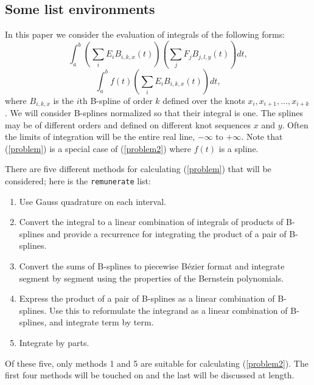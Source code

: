 \subsection{Some list environments}
In this paper we consider the evaluation of integrals of the 
following forms:
\begin{equation}
\int_a^b \left( \sum_i E_i B_{i,k,x}(t) \right)
         \left( \sum_j F_j B_{j,l,y}(t) \right) dt,\label{problem}
\end{equation}
\begin{equation}
\int_a^b f(t) \left( \sum_i E_i B_{i,k,x}(t) \right) dt,\label{problem2}
\end{equation}
where $B_{i,k,x}$ is the $i$th B-spline of order $k$ defined over the
knots $x_i, x_{i+1}, \ldots, x_{i+k}$.
We will consider B-splines normalized so that their integral is one.
The splines may be of different orders and
defined on different knot sequences $x$ and $y$.
Often the limits of integration will be the entire real line, $-\infty$
to $+\infty$. Note that (\ref{problem}) is a special case of (\ref{problem2})
where $f(t)$ is a spline.


There are five different methods for calculating (\ref{problem})
that will be considered; here is the \verb+remunerate+ list:
\begin{enumerate}
\item Use Gauss quadrature on each interval.
\item Convert the integral to a linear combination of
      integrals of products of B-splines and provide a recurrence for
      integrating the product of a pair of B-splines.
\item Convert the sums of B-splines to piecewise
      B\'{e}zier format and integrate segment
      by segment using the properties of the Bernstein polynomials.
\item Express the product of a pair of B-splines as a linear combination
      of B-splines.
      Use this to reformulate the integrand as a linear combination
      of B-splines, and integrate term by term.
\item Integrate by parts.
\end{enumerate}
Of these five, only methods 1 and 5 are suitable for calculating 
(\ref{problem2}). The first four methods will be touched on and the 
last will be discussed at length.

